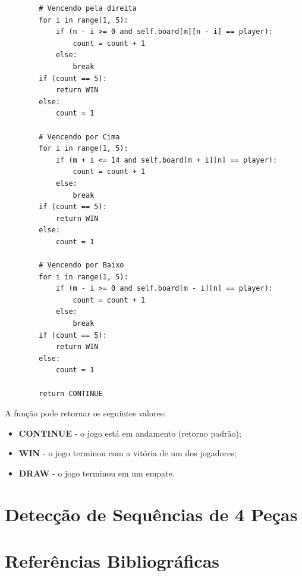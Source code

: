 \documentclass[10pt,a4paper]{article}
\begin{document}
\begin{verbatim}
        # Vencendo pela direita
        for i in range(1, 5):
            if (n - i >= 0 and self.board[m][n - i] == player):
                count = count + 1
            else:
                break
        if (count == 5):
            return WIN
        else:
            count = 1

        # Vencendo por Cima
        for i in range(1, 5):
            if (m + i <= 14 and self.board[m + i][n] == player):
                count = count + 1
            else:
                break
        if (count == 5):
            return WIN
        else:
            count = 1

        # Vencendo por Baixo
        for i in range(1, 5):
            if (m - i >= 0 and self.board[m - i][n] == player):
                count = count + 1
            else:
                break
        if (count == 5):
            return WIN
        else:
            count = 1

        return CONTINUE
\end{verbatim}

A função pode retornar os seguintes valores:
%
\begin{itemize}
    \item \textbf{CONTINUE} - o jogo está em andamento (retorno padrão);
    \item \textbf{WIN} - o jogo terminou com a vitória de um dos jogadores;
    \item \textbf{DRAW} - o jogo terminou em um empate.
\end{itemize}



\section{Detecção de Sequências de 4 Peças}





\section{Referências Bibliográficas}
\end{document}
